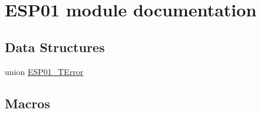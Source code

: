 \hypertarget{group___e_s_p01__module}{}\section{E\+S\+P01 module documentation}
\label{group___e_s_p01__module}
\subsection*{Data Structures}
\begin{DoxyCompactItemize}
\item 
union \hyperlink{union_e_s_p01___t_error}{E\+S\+P01\+\_\+\+T\+Error}
\end{DoxyCompactItemize}
\subsection*{Macros}
